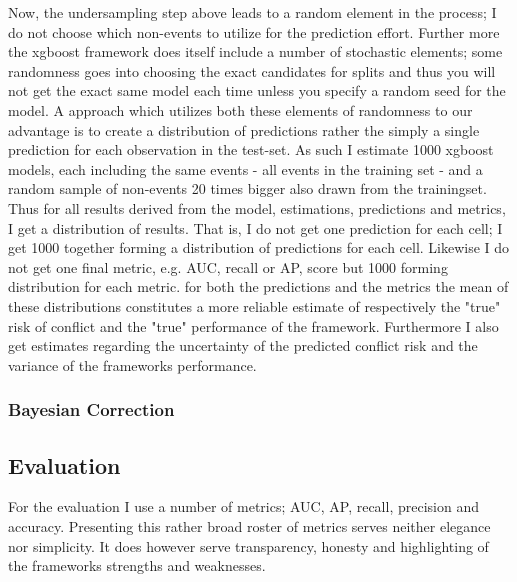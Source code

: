 \documentclass[a4paper]{article}
\begin{document}
Now, the undersampling step above leads to a random element in the process; I do not choose which non-events to utilize for the prediction effort. Further more the xgboost framework does itself include a number of stochastic elements; some randomness goes into choosing the exact candidates for splits and thus you will not get the exact same model each time unless you specify a random seed for the model. A approach which utilizes both these elements of randomness  to our advantage is to create a distribution of predictions rather the simply a single prediction for each observation in the test-set. As such I estimate 1000 xgboost models, each including the same events - all events in the training set - and a random sample of non-events 20 times bigger also drawn from the trainingset. Thus for all results derived from the model, estimations, predictions and metrics, I get a distribution of results. That is, I do not get one prediction for each cell; I get 1000 together forming a distribution of predictions for each cell. Likewise I do not get one final metric, e.g. AUC, recall or AP, score but 1000 forming distribution for each metric. for both the predictions and the metrics the mean of these distributions constitutes a more reliable estimate of respectively the "true" risk of conflict and the "true" performance of the framework. Furthermore I also get estimates regarding the uncertainty of the predicted conflict risk and the variance of the frameworks performance.\par

\subsubsection{Bayesian Correction}

\subsection{Evaluation}

For the evaluation I use a number of metrics; AUC, AP, recall, precision and accuracy. Presenting this rather broad roster of metrics serves neither elegance nor simplicity. It does however serve transparency, honesty and highlighting of the frameworks strengths and weaknesses.

\end{document}
